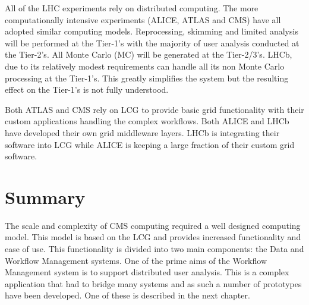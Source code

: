 All of the LHC experiments rely on distributed computing. The more computationally intensive experiments (ALICE, ATLAS and CMS) have all adopted similar computing models. Reprocessing, skimming and limited analysis will be performed at the Tier-1's with the majority of user analysis conducted at the Tier-2's. All Monte Carlo (MC) will be generated at the Tier-2/3's. LHCb, due to its relatively modest requirements can handle all its non Monte Carlo processing at the Tier-1's. This greatly simplifies the system but the resulting effect on the Tier-1's is not fully understood. 

Both ATLAS and CMS rely on LCG to provide basic grid functionality with their custom applications handling the complex workflows. Both ALICE and LHCb have developed their own grid middleware layers. LHCb is integrating their software into LCG while ALICE is keeping a large fraction of their custom grid software.

\section{Summary}
The scale and complexity of CMS computing required a well designed computing model. This model is based on the LCG and provides increased functionality and ease of use. This functionality is divided into two main components: the Data and Workflow Management systems. One of the prime aims of the Workflow Management system is to support distributed user analysis. This is a complex application that had to bridge many systems and as such a number of prototypes have been developed. One of these is described in the next chapter.
